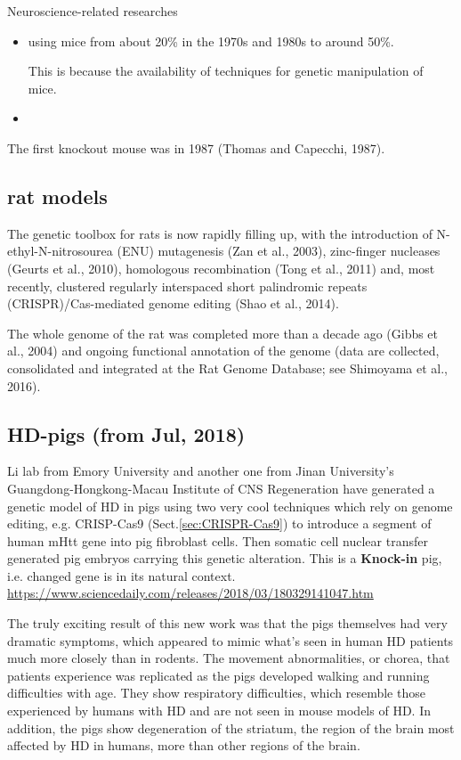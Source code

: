Neuroscience-related researches
\begin{itemize}
  \item using mice from about 20\% in the 1970s and 1980s to around 50\%.
  
  This is because the availability of  techniques for genetic manipulation of
  mice.
  
  \item 
\end{itemize}

The first knockout mouse was in 1987 (Thomas and Capecchi, 1987).

\subsection{rat models}
\label{sec:rat-models}

The genetic toolbox for rats is now rapidly filling up, with the introduction of
N-ethyl-N-nitrosourea (ENU) mutagenesis (Zan et al., 2003), zinc-finger
nucleases (Geurts et al., 2010), homologous recombination (Tong et al., 2011)
and, most recently, clustered regularly interspaced short palindromic repeats
(CRISPR)/Cas-mediated genome editing (Shao et al., 2014).

The whole genome of the rat was completed more than a decade ago (Gibbs et al.,
2004) and ongoing functional annotation of the genome (data are collected,
consolidated and integrated at the Rat Genome Database; see Shimoyama et al.,
2016).

\subsection{HD-pigs (from Jul, 2018)}
\label{sec:HD-pigs}

Li lab from Emory University and another one from Jinan University's
Guangdong-Hongkong-Macau Institute of CNS Regeneration have generated a genetic
model of HD in pigs using two very cool techniques which rely on genome editing,
e.g. CRISP-Cas9 (Sect.\ref{sec:CRISPR-Cas9}) to introduce a segment of human
mHtt gene  into pig fibroblast cells. Then somatic cell nuclear transfer
generated pig embryos carrying this genetic alteration. This is a {\bf Knock-in}
pig, i.e. changed gene is in its natural context.
\url{https://www.sciencedaily.com/releases/2018/03/180329141047.htm}

The truly exciting result of this new work was that the pigs themselves had very
dramatic symptoms, which appeared to mimic what's seen in human HD patients much
more closely than in rodents. The movement abnormalities, or chorea, that
patients experience was replicated as the pigs developed walking and running
difficulties with age.
They show respiratory difficulties, which resemble those experienced by humans
with HD and are not seen in mouse models of HD.  In addition, the pigs show
degeneration of the striatum, the region of the brain most affected by HD in
humans, more than other regions of the brain. 

